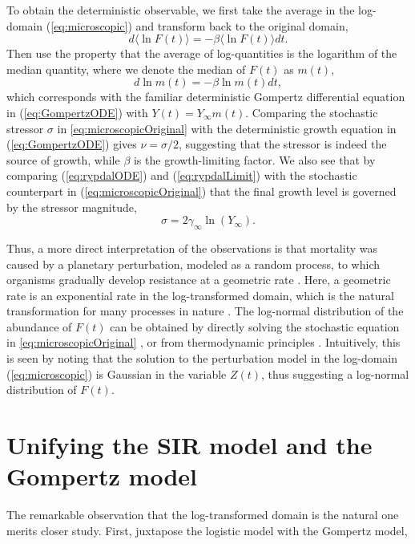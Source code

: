 \documentclass{article}
\begin{document}
To obtain the deterministic observable, we first take the average in the log-domain (\ref{eq:microscopic}) and transform back to the original domain, 
\begin{equation}
d\langle\ln{F(t)}\rangle = -\beta \langle\ln{F(t)}\rangle dt.
\end{equation}
Then use the property that the average of log-quantities is the logarithm of the median quantity, where we denote the median of $F(t)$ as $m(t)$, 
\begin{equation}
\label{eq:medianGomp}
d\ln{m(t)} = -\beta \ln{m(t)} dt,
\end{equation}
which corresponds with the familiar deterministic Gompertz differential equation in (\ref{eq:GompertzODE}) with $Y(t) = Y_\infty m(t)$. 
Comparing the stochastic stressor $\sigma$ in \ref{eq:microscopicOriginal} with the deterministic growth equation in (\ref{eq:GompertzODE}) gives $\nu=\sigma/2$, suggesting that the stressor is indeed the source of growth, while $\beta$ is the growth-limiting factor. 
We also see that by comparing (\ref{eq:rypdalODE}) and (\ref{eq:rypdalLimit}) with the stochastic counterpart in (\ref{eq:microscopicOriginal}) that the final growth level is governed by the stressor magnitude,
\begin{equation}
\sigma = 2\gamma_{\infty}\ln{(Y_{\infty})}.
\end{equation}

Thus, a more direct interpretation of the observations is that mortality was caused by a planetary perturbation, modeled as a random process, to which organisms gradually develop resistance at a geometric rate \citep{boxenbaum2017hypotheses,neafsey1988gompertz}. 
Here, a geometric rate is an exponential rate in the log-transformed domain, which is the natural transformation for many processes in nature \citep{zhang1994log}. 
The log-normal distribution of the abundance of $F(t)$ can be obtained by directly solving the stochastic equation in \ref{eq:microscopicOriginal} \citep{skiadas2010exact,petroni2020gompertz}, or from thermodynamic principles \citep{sitaram1984statistical,gunasekaran1982lon}. 
Intuitively, this is seen by noting that the solution to the perturbation model in the log-domain (\ref{eq:microscopic}) is Gaussian in the variable $Z(t)$, thus suggesting a log-normal distribution of $F(t)$. 

\section{Unifying the SIR model and the Gompertz model}
The remarkable observation that the log-transformed domain is the natural one merits closer study. First, juxtapose the logistic model with the Gompertz model,
\end{document}
